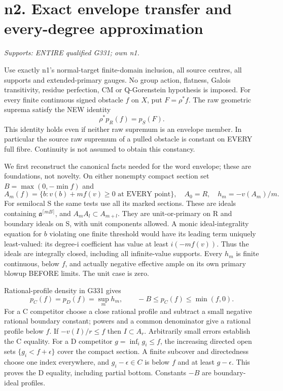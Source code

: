 \section{n2. Exact envelope transfer and every-degree approximation}
\textit{Supports: ENTIRE qualified G331; own n1.}

Use exactly n1's normal-target finite-domain inclusion, all source centres,
all supports and extended-primary gauges. No group action, flatness,
Galois transitivity, residue perfection, CM or Q-Gorenstein hypothesis is
imposed. For every finite continuous signed obstacle $f$ on $X$, put
$F=\rho^*f$. The raw geometric suprema satisfy the NEW identity
\[
                 \rho^*p_R(f)=p_S(F).                      \tag{5}
\]
This identity holds even if neither raw supremum is an envelope member.
In particular the source raw supremum of a pulled obstacle is constant
on EVERY full fibre. Continuity is not assumed to obtain this constancy.

We first reconstruct the canonical facts needed for the word envelope;
these are foundations, not novelty. On either nonempty compact section
set $B=\max(0,-\min f)$ and
\[
 A_m(f)=\{b:v(b)+mf(v)\ge0\text{ at EVERY point}\},\quad
 A_0=R,\quad h_m=-v(A_m)/m.
\]
For semilocal S the same tests use all its marked sections. These are
ideals containing $\mathfrak a^{\lceil mB\rceil}$, and
$A_mA_l\subset A_{m+l}$. They are unit-or-primary on R and boundary
ideals on S, with unit components allowed. A monic ideal-integrality
equation for $b$ violating one finite threshold would have its leading
term uniquely least-valued: its degree-i coefficient has value at least
$i(-mf(v))$. Thus the ideals are integrally closed, including all
infinite-value supports. Every $h_m$ is finite continuous, below $f$,
and actually negative effective ample on its own primary blowup BEFORE
limits. The unit case is zero.

Rational-profile density in G331 gives
\[
 p_C(f)=p_D(f)=\sup_m h_m,
 \qquad -B\le p_C(f)\le\min(f,0).                          \tag{6}
\]
For a C competitor choose a close rational profile and subtract a small
negative rational boundary constant; powers and a common denominator
give a rational profile below $f$. If $-v(I)/r\le f$ then
$I\subset A_r$. Arbitrarily small errors establish the C equality.
For a D competitor $g=\inf_i g_i\le f$, the increasing directed open
sets $\{g_i<f+\epsilon\}$ cover the compact section. A finite subcover
and directedness choose one index everywhere, and $g_i-\epsilon\in C$
is below $f$ and at least $g-\epsilon$. This proves the D equality,
including partial bottom. Constants $-B$ are boundary-ideal profiles.


